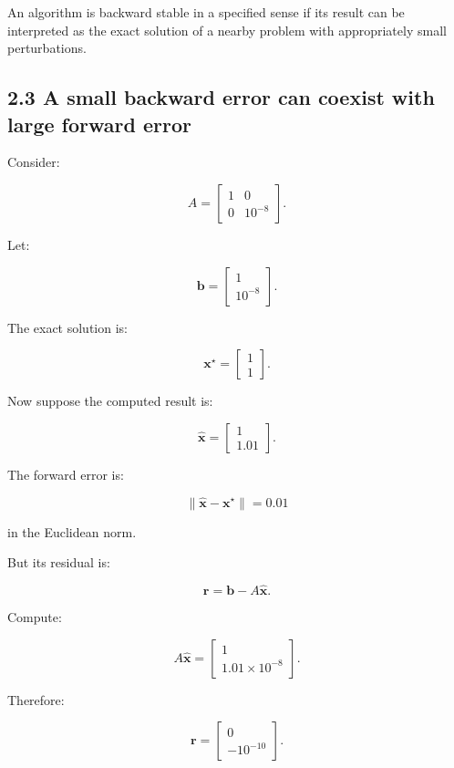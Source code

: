 An algorithm is backward stable in a specified sense if its result can be interpreted as the exact solution of a nearby problem with appropriately small perturbations.

\subsection{2.3 A small backward error can coexist with large forward error}\label{02-foundations-ii-ch028-a-small-backward-error-can-coexist-with-large-forward-error}

Consider:

\[ A= \begin{bmatrix} 1&0\\ 0&10^{-8} \end{bmatrix}. \]

Let:

\[ \mathbf b= \begin{bmatrix} 1\\ 10^{-8} \end{bmatrix}. \]

The exact solution is:

\[ \mathbf x^\star= \begin{bmatrix} 1\\ 1 \end{bmatrix}. \]

Now suppose the computed result is:

\[ \hat{\mathbf x}= \begin{bmatrix} 1\\ 1.01 \end{bmatrix}. \]

The forward error is:

\[ \|\hat{\mathbf x}-\mathbf x^\star\| =0.01 \]

in the Euclidean norm.

But its residual is:

\[ \mathbf r=\mathbf b-A\hat{\mathbf x}. \]

Compute:

\[ A\hat{\mathbf x} = \begin{bmatrix} 1\\ 1.01\times10^{-8} \end{bmatrix}. \]

Therefore:

\[ \mathbf r= \begin{bmatrix} 0\\ -10^{-10} \end{bmatrix}. \]

